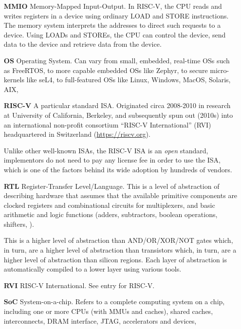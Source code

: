 \begin{itemize}
\item[\bf MMIO] Memory-Mapped Input-Output.  In RISC-V, the CPU reads
  and writes registers in a device using ordinary LOAD and STORE
  instructions.  The memory system interprets the addresses to direct
  such requests to a device.  Using LOADs and STOREs, the CPU can
  control the device, send data to the device and retrieve data from
  the device.

\item[\bf OS] Operating System.  Can vary from small, embedded,
  real-time OSs such as FreeRTOS, to more capable embedded OSs like
  Zephyr, to secure micro-kernels like seL4, to full-featured OSs like
  Linux, Windows, MacOS, Solaris, AIX, {\etc}

\item[\bf RISC-V] A particular standard ISA.  Originated circa
  2008-2010 in research at University of California, Berkeley, and
  subsequently spun out (2010s) into an international non-profit
  consortium ``RISC-V International'' (RVI) headquartered in
  Switzerland (\url{https://riscv.org}).

  Unlike other well-known ISAs, the RISC-V ISA is an \emph{open}
  standard, {\ie} implementors do not need to pay any license fee in
  order to use the ISA, which is one of the factors behind its wide
  adoption by hundreds of vendors.

\item[\bf RTL] Register-Transfer Level/Language.  This is a level of
  abstraction of describing hardware that assumes that the available
  primitive components are clocked registers and combinational
  circuits for multiplexers, and basic arithmetic and logic functions
  (adders, subtractors, boolean operations, shifters, {\etc}).

  This is a higher level of abstraction than AND/OR/XOR/NOT gates
  which, in turn, are a higher level of abstraction than transistors
  which, in turn, are a higher level of abstraction than silicon
  regions.  Each layer of abstraction is automatically compiled to a
  lower layer using various tools.

\item[\bf RVI] RISC-V International.  See entry for RISC-V.

\item[\bf SoC] System-on-a-chip.  Refers to a complete computing
  system on a chip, including one or more CPUs (with MMUs and caches),
  shared caches, interconnects, DRAM interface, JTAG, accelerators and
  devices, {\etc}


\end{itemize}
